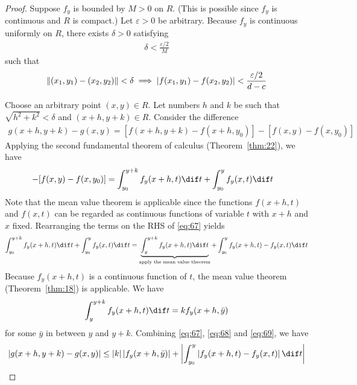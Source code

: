 \documentclass[thmcnt=section, color=blue, 12pt]{my-elegantbook}
\begin{document}
\begin{proof}
	Suppose $f_y$ is bounded by $M > 0$ on $R$.
	(This is possible since $f_y$ is continuous and $R$ is compact.)
	Let $\varepsilon > 0$ be arbitrary.
	Because $f_y$ is continuous uniformly on $R$,
	there exists $\delta > 0$ satisfying
	\begin{align*}
		\delta < \frac{\varepsilon / 2}{M}
	\end{align*}
	such that
	\begin{align*}
		\left\lVert (x_1, y_1) - (x_2, y_2) \right\rVert < \delta
		\implies \left\lvert f(x_1, y_1) - f(x_2, y_2) \right\rvert < \frac{\varepsilon / 2}{d - c}
	\end{align*}

	Choose an arbitrary point $(x, y) \in R$.
	Let numbers $h$ and $k$ be such
	that $\sqrt{h^2 + k^2} < \delta$ and $(x+h, y+k) \in R$.
	Consider the difference
	\begin{align*}
		g(x+h, y+k) - g(x, y)
		= [f(x+h, y+k) - f(x+h, y_0)] - [f(x, y) - f(x, y_0)]
	\end{align*}
	Applying the second fundamental theorem of calculus (Theorem~\ref{thm:22}),
	we have
	\begin{align}
		[f(x+h, y+k) - f(x+h, y_0)] - [f(x, y) - f(x, y_0)]
		 & = \int_{y_0}^{y+k} f_y(x+h, t) \dif t
		+ \int_{y_0}^{y} f_y(x, t) \dif t
		\label{eq:67}
	\end{align}
	Note that the mean value theorem is applicable since
	the functions $f(x+h, t)$ and $f(x, t)$ can be regarded as continuous
	functions of variable $t$ with $x+h$ and $x$ fixed.
	Rearranging the terms on the RHS of \eqref{eq:67} yields
	\begin{align}
		\int_{y_0}^{y+k} f_y(x+h, t) \dif t
		+ \int_{y_0}^{y} f_y(x, t) \dif t
		= \underbrace{\int_y^{y+k} f_y(x+h, t) \dif t}_{\text{apply the mean value theorem}}
		+ \int_{y_0}^{y} f_y(x+h, t) - f_y(x, t) \dif t
		\label{eq:68}
	\end{align}
	Because $f_y(x+h, t)$ is a continuous function of $t$,
	the mean value theorem (Theorem~\ref{thm:18}) is applicable.
	We have
	\begin{align}
		\int_y^{y+k} f_y(x+h, t) \dif t = k f_y(x+h, \bar{y})
		\label{eq:69}
	\end{align}
	for some $\bar{y}$ in between $y$ and $y+k$.
	Combining \eqref{eq:67}, \eqref{eq:68} and \eqref{eq:69}, we have
	\begin{align}
		\abs{g(x+h, y+k) - g(x, y)}
		\leq \abs{k} \abs{f_y(x+h, \bar{y})}
		+ \abs{ \int_{y_0}^y \abs{f_y(x+h, t) - f_y(x, t)} \dif t }
		\label{eq:70}
	\end{align}


\end{proof}
\end{document}
